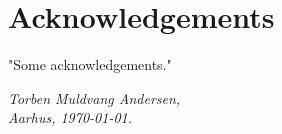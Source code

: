 \chapter{Acknowledgements}

"Some acknowledgements."

\vspace{2ex}
\begin{flushright}
  \emph{Torben Muldvang Andersen,}\\
  \emph{Aarhus, \today.}
\end{flushright}

\cleardoublepage{}


